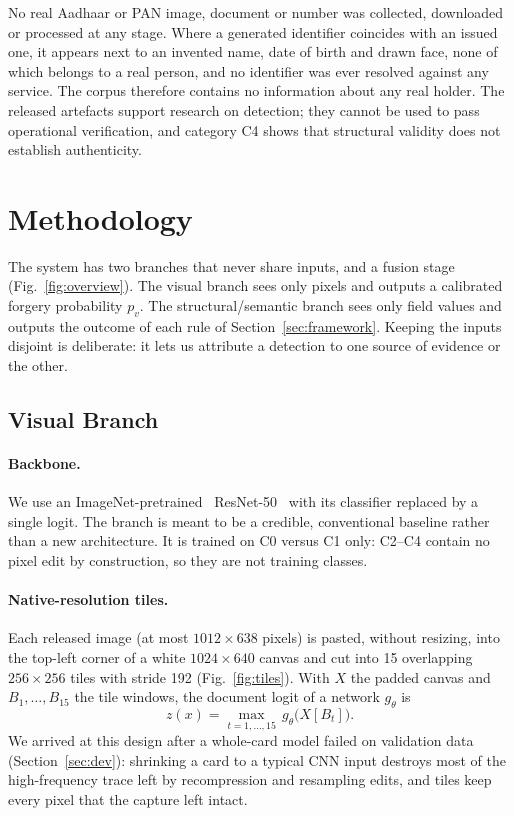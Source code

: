 \documentclass[conference]{IEEEtran}
\begin{document}
No real Aadhaar or PAN image, document or number was collected,
downloaded or processed at any stage. Where a generated identifier
coincides with an issued one, it appears next to an invented name, date
of birth and drawn face, none of which belongs to a real person, and no
identifier was ever resolved against any service. The corpus therefore
contains no information about any real holder. The released artefacts
support research on detection; they cannot be used to pass operational
verification, and category C4 shows that structural validity does not
establish authenticity.

\section{Methodology}
\label{sec:method}

The system has two branches that never share inputs, and a fusion stage
(Fig.~\ref{fig:overview}). The visual branch sees only pixels and
outputs a calibrated forgery probability $p_v$. The
structural/semantic branch sees only field values and outputs the
outcome of each rule of Section~\ref{sec:framework}. Keeping the inputs
disjoint is deliberate: it lets us attribute a detection to one
source of evidence or the other.

\subsection{Visual Branch}
\label{sec:visual}

\paragraph*{Backbone.} We use an ImageNet-pretrained~\cite{imagenet}
ResNet-50~\cite{resnet} with its classifier replaced by a single logit.
The branch is meant to be a credible, conventional baseline rather than
a new architecture. It is trained on C0 versus C1 only: C2--C4 contain
no pixel edit by construction, so they are not training classes.

\paragraph*{Native-resolution tiles.} Each released image (at most
$1012{\times}638$ pixels) is pasted, without resizing, into the top-left
corner of a white $1024{\times}640$ canvas and cut into 15 overlapping
$256{\times}256$ tiles with stride 192 (Fig.~\ref{fig:tiles}). With
$X$ the padded canvas and $B_1,\dots,B_{15}$ the tile windows, the
document logit of a network $g_\theta$ is
\begin{equation}
\label{eq:maxtile}
z(x)=\max_{t=1,\dots,15}\, g_\theta\big(X[B_t]\big).
\end{equation}
We arrived at this design
after a whole-card model failed on validation data
(Section~\ref{sec:dev}): shrinking a card to a typical CNN input
destroys most of the high-frequency trace left by recompression and
resampling edits, and tiles keep every pixel that the capture left
intact.
\end{document}
